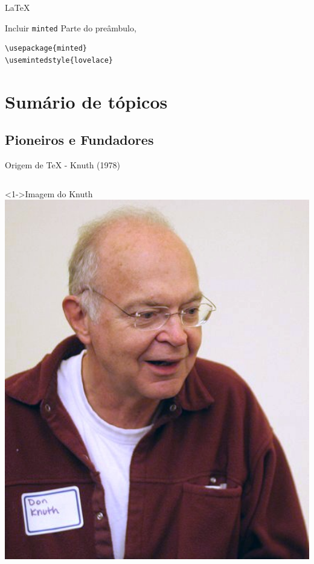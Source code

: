 \documentclass[bigger]{beamer}
\begin{document}
{\begin{frame}[label={sec:org8cae376},fragile]{\LaTeX{}}
 \begin{block}{Incluir \texttt{minted}}
Parte do preâmbulo,
\begin{verbatim}
\usepackage{minted}
\usemintedstyle{lovelace}
\end{verbatim}
\end{block}
\end{frame}
\section{Sumário de tópicos}
\label{sec:org0a68521}
\subsection{Pioneiros e Fundadores}
\label{sec:orgdff8101}
\begin{frame}[label={sec:org70f3669},fragile]{Origem de \TeX{} - Knuth (1978)}
 \begin{columns}
\begin{column}{0.48\columnwidth}
\begin{block}<1->{Imagem do Knuth}
\href{img/KnuthAtOpenContentAlliance.jpg}{\includegraphics[width=1.02\textwidth]{./img/KnuthAtOpenContentAlliance.jpg}}

\end{block}
\end{column}
\end{columns}
\end{frame}}
\end{document}
